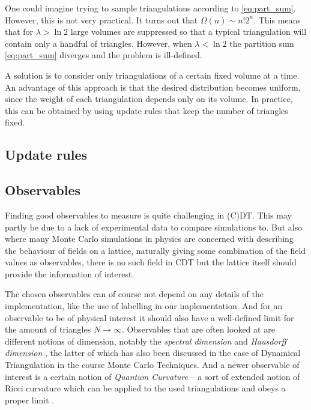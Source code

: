 One could imagine trying to sample triangulations according to \eqref{eq:part_sum}.
However, this is not very practical. It turns out that $\Omega(n) \sim n! 2^n$. This means that for $\lambda > \ln 2$ large volumes are suppressed so that a typical triangulation will contain only a handful of triangles.
However, when $\lambda < \ln 2$ the partition sum \eqref{eq:part_sum} diverges and the problem is ill-defined.

A solution is to consider only triangulations of a certain fixed volume at a time.
An advantage of this approach is that the desired distribution becomes uniform, since the weight of each triangulation depends only on its volume.
In practice, this can be obtained by using update rules that keep the number of triangles fixed.

\subsection{Update rules}

\subsection{Observables} \label{sec:observables}
Finding good observables to measure is quite challenging in (C)DT. This may partly be due to a lack of experimental data to compare simulations to.
But also where many Monte Carlo simulations in physics are concerned with describing the behaviour of fields on a lattice, naturally giving some combination of the field values as observables,
there is no such field in CDT but the lattice itself should provide the information of interest.

The chosen observables can of course not depend on any details of the implementation, like the use of labelling in our implementation.
And for an observable to be of physical interest it should also have a well-defined limit for the amount of triangles $N \rightarrow \infty$.
Observables that are often looked at are different notions of dimension, notably the \emph{spectral dimension} \cite{2012} and \emph{Hausdorff dimension} \cite{1998, 2012}, the latter of which has also been discussed in the case of Dynamical Triangulation in the course Monte Carlo Techniques. And a newer observable of interest is a certain notion of \emph{Quantum Curvature} -- a sort of extended notion of Ricci curvature which can be applied to the used triangulations and obeys a proper limit \cite{brunekreef2021}.

